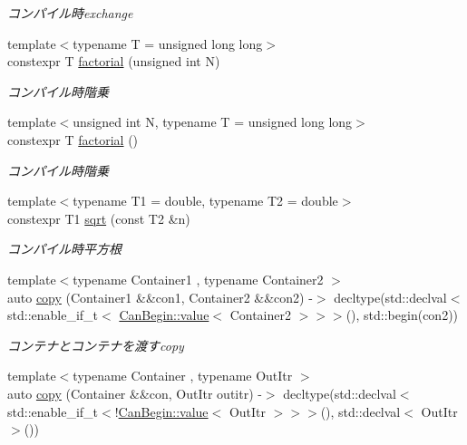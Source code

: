 \begin{DoxyCompactItemize}
\begin{DoxyCompactList}\small\item\em コンパイル時exchange \end{DoxyCompactList}\item 
{\footnotesize template$<$typename T  = unsigned long long$>$ }\\constexpr T \mbox{\hyperlink{namespacesaki_a59cd7e099937e5f8bcf5aa612745690c}{factorial}} (unsigned int N)
\begin{DoxyCompactList}\small\item\em コンパイル時階乗 \end{DoxyCompactList}\item 
{\footnotesize template$<$unsigned int N, typename T  = unsigned long long$>$ }\\constexpr T \mbox{\hyperlink{namespacesaki_a9dead910b791cee99cf82d1bd2a5d90c}{factorial}} ()
\begin{DoxyCompactList}\small\item\em コンパイル時階乗 \end{DoxyCompactList}\item 
{\footnotesize template$<$typename T1  = double, typename T2  = double$>$ }\\constexpr T1 \mbox{\hyperlink{namespacesaki_a1059e80b300067041c754c1686b04dbd}{sqrt}} (const T2 \&n)
\begin{DoxyCompactList}\small\item\em コンパイル時平方根 \end{DoxyCompactList}\item 
{\footnotesize template$<$typename Container1 , typename Container2 $>$ }\\auto \mbox{\hyperlink{namespacesaki_aab5bc42749f8856797942222a6fa8d09}{copy}} (Container1 \&\&con1, Container2 \&\&con2) -\/$>$ decltype(std\+::declval$<$ std\+::enable\+\_\+if\+\_\+t$<$ \mbox{\hyperlink{structsaki_1_1_can_begin_abd4e5cbf549dbd55bc2421476a94b505}{Can\+Begin\+::value}}$<$ Container2 $>$$>$$>$(), std\+::begin(con2))
\begin{DoxyCompactList}\small\item\em コンテナとコンテナを渡すcopy \end{DoxyCompactList}\item 
{\footnotesize template$<$typename Container , typename Out\+Itr $>$ }\\auto \mbox{\hyperlink{namespacesaki_ac0e54eca8b5a57e75bad41d199756ce2}{copy}} (Container \&\&con, Out\+Itr outitr) -\/$>$ decltype(std\+::declval$<$ std\+::enable\+\_\+if\+\_\+t$<$!\mbox{\hyperlink{structsaki_1_1_can_begin_abd4e5cbf549dbd55bc2421476a94b505}{Can\+Begin\+::value}}$<$ Out\+Itr $>$$>$$>$(), std\+::declval$<$ Out\+Itr $>$())

\end{DoxyCompactItemize}
